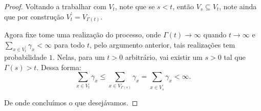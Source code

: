 \begin{proof}
  Voltando a trabalhar com $V_t$, note que se $s < t$, então $V_s
  \subseteq V_t$, note ainda que por construção $V^\prime_t =
  V_{\Gamma(t)}$.

  Agora fixe tome uma realização do processo, onde $\Gamma(t) \to
  \infty$ quando $t \to \infty$ e $\sum_{x \in V^\prime_t} \gamma_x <
  \infty$ para todo $t$, pelo argumento anterior, tais realizações tem
  probabilidade $1$. Nelas, para um $t > 0$ arbitrário, vai existir
  um $s > 0$ tal que $\Gamma(s) > t$. Dessa forma:
  \begin{displaymath}
    \sum_{x \in V_t} \gamma_x \leq \sum_{x \in V_{\Gamma(s)}}
    \gamma_x =
    \sum_{x \in V^\prime_s} \gamma_x < \infty.
  \end{displaymath}

  De onde concluímos o que desejávamos.
\end{proof}




